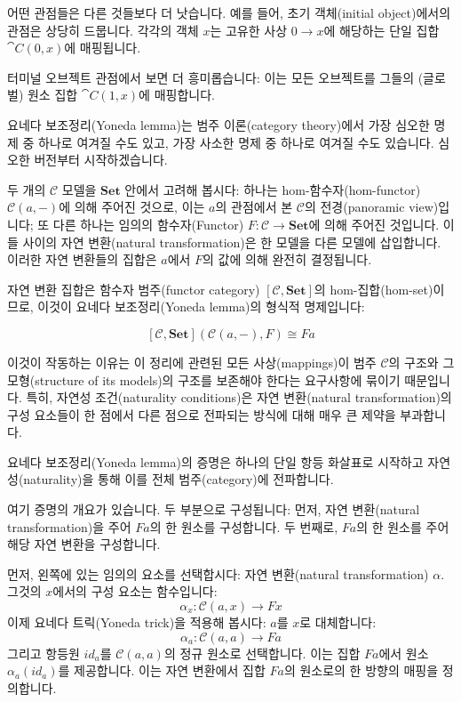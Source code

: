 \documentclass[DaoFP]{subfiles}
\begin{document}
어떤 관점들은 다른 것들보다 더 낫습니다. 예를 들어, 초기 객체(initial object)에서의 관점은 상당히 드뭅니다. 각각의 객체 $x$는 고유한 사상 $0 \to x$에 해당하는 단일 집합 $\cat C(0, x)$에 매핑됩니다.

터미널 오브젝트 관점에서 보면 더 흥미롭습니다: 이는 모든 오브젝트를 그들의 (글로벌) 원소 집합 $\cat C(1, x)$에 매핑합니다.

요네다 보조정리(Yoneda lemma)는 범주 이론(category theory)에서 가장 심오한 명제 중 하나로 여겨질 수도 있고, 가장 사소한 명제 중 하나로 여겨질 수도 있습니다. 심오한 버전부터 시작하겠습니다.

두 개의 $\mathcal{C}$ 모델을 $\mathbf{Set}$ 안에서 고려해 봅시다: 하나는 hom-함수자(hom-functor) $\mathcal{C}(a, -)$에 의해 주어진 것으로, 이는 $a$의 관점에서 본 $\mathcal{C}$의 전경(panoramic view)입니다; 또 다른 하나는 임의의 함수자(Functor) $F \colon \mathcal{C} \to \mathbf{Set}$에 의해 주어진 것입니다. 이들 사이의 자연 변환(natural transformation)은 한 모델을 다른 모델에 삽입합니다. 이러한 자연 변환들의 집합은 $a$에서 $F$의 값에 의해 완전히 결정됩니다.

자연 변환 집합은 함수자 범주(functor category) $[\mathcal{C}, \mathbf{Set}]$의 hom-집합(hom-set)이므로, 이것이 요네다 보조정리(Yoneda lemma)의 형식적 명제입니다:

\[ [\mathcal{C}, \mathbf{Set}]( \mathcal{C}(a, -), F) \cong F a \]

이것이 작동하는 이유는 이 정리에 관련된 모든 사상(mappings)이 범주 $\mathcal{C}$의 구조와 그 모형(structure of its models)의 구조를 보존해야 한다는 요구사항에 묶이기 때문입니다. 특히, 자연성 조건(naturality conditions)은 자연 변환(natural transformation)의 구성 요소들이 한 점에서 다른 점으로 전파되는 방식에 대해 매우 큰 제약을 부과합니다.

요네다 보조정리(Yoneda lemma)의 증명은 하나의 단일 항등 화살표로 시작하고 자연성(naturality)을 통해 이를 전체 범주(category)에 전파합니다.

여기 증명의 개요가 있습니다. 두 부분으로 구성됩니다: 먼저, 자연 변환(natural transformation)을 주어 $F a$의 한 원소를 구성합니다. 두 번째로, $F a$의 한 원소를 주어 해당 자연 변환을 구성합니다.

먼저, 왼쪽에 있는 임의의 요소를 선택합시다: 자연 변환(natural transformation) $\alpha$. 그것의 $x$에서의 구성 요소는 함수입니다:
\[ \alpha_x \colon \mathcal{C}(a, x) \to F x \]
이제 요네다 트릭(Yoneda trick)을 적용해 봅시다: $a$를 $x$로 대체합니다:
\[ \alpha_a \colon \mathcal{C}(a, a) \to F a \]
그리고 항등원 $id_a$를 $\mathcal{C}(a, a)$의 정규 원소로 선택합니다. 이는 집합 $F a$에서 원소 $\alpha_a (id_a)$를 제공합니다. 이는 자연 변환에서 집합 $F a$의 원소로의 한 방향의 매핑을 정의합니다.
\end{document}
